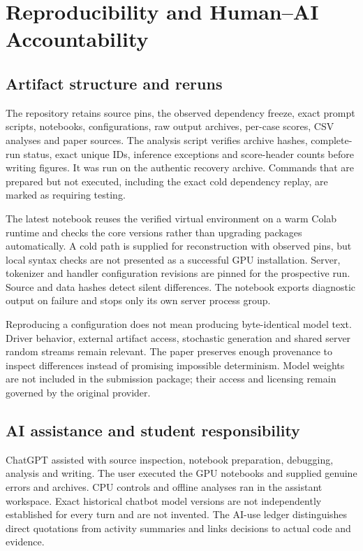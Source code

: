 \documentclass[conference]{IEEEtran}
\begin{document}
\section{Reproducibility and Human--AI Accountability}
\subsection{Artifact structure and reruns}
The repository retains source pins, the observed dependency freeze, exact prompt scripts, notebooks, configurations, raw output archives, per-case scores, CSV analyses and paper sources. The analysis script verifies archive hashes, complete-run status, exact unique IDs, inference exceptions and score-header counts before writing figures. It was run on the authentic recovery archive. Commands that are prepared but not executed, including the exact cold dependency replay, are marked as requiring testing.

The latest notebook reuses the verified virtual environment on a warm Colab runtime and checks the core versions rather than upgrading packages automatically. A cold path is supplied for reconstruction with observed pins, but local syntax checks are not presented as a successful GPU installation. Server, tokenizer and handler configuration revisions are pinned for the prospective run. Source and data hashes detect silent differences. The notebook exports diagnostic output on failure and stops only its own server process group.

Reproducing a configuration does not mean producing byte-identical model text. Driver behavior, external artifact access, stochastic generation and shared server random streams remain relevant. The paper preserves enough provenance to inspect differences instead of promising impossible determinism. Model weights are not included in the submission package; their access and licensing remain governed by the original provider.

\subsection{AI assistance and student responsibility}
ChatGPT assisted with source inspection, notebook preparation, debugging, analysis and writing. The user executed the GPU notebooks and supplied genuine errors and archives. CPU controls and offline analyses ran in the assistant workspace. Exact historical chatbot model versions are not independently established for every turn and are not invented. The AI-use ledger distinguishes direct quotations from activity summaries and links decisions to actual code and evidence.
\end{document}
